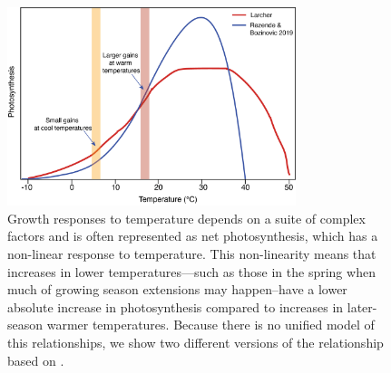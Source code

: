 \documentclass[11pt]{article}
\begin{document}
\clearpage
\begin{figure}[h!]
\includegraphics[width=0.75\textwidth]{..//figures/tempresponse/drafttempfig.png}
\caption{Growth responses to temperature depends on a suite of complex factors and is often represented as net photosynthesis, which has a non-linear response to temperature. This non-linearity means that increases in lower temperatures---such as those in the spring when much of growing season extensions may happen--have a lower absolute increase in photosynthesis compared to increases in later-season warmer temperatures. Because there is no unified model of this relationships, we show two different versions of the relationship based on \citet{larcher2003,rezende2019thermal}.}
\label{fig:temperaturecomplex}
\end{figure}
\end{document}
